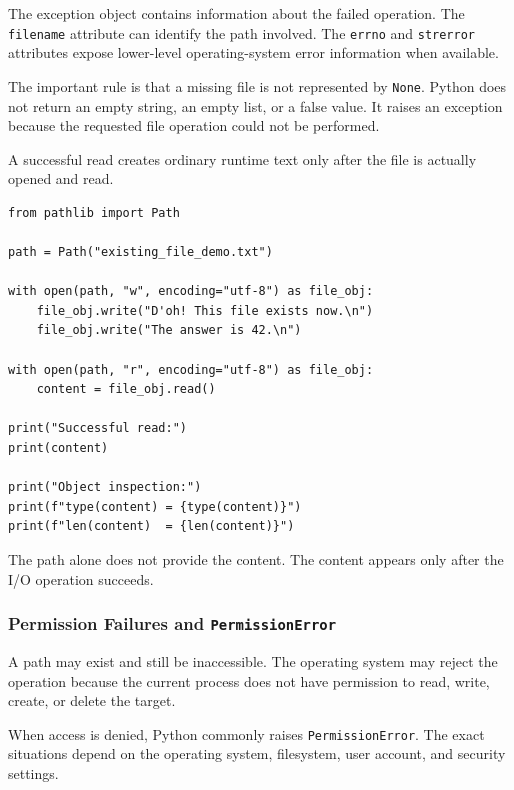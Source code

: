 The exception object contains information about the failed operation. The \texttt{filename} attribute can identify the path involved. The \texttt{errno} and \texttt{strerror} attributes expose lower-level operating-system error information when available.

The important rule is that a missing file is not represented by \texttt{None}. Python does not return an empty string, an empty list, or a false value. It raises an exception because the requested file operation could not be performed.

A successful read creates ordinary runtime text only after the file is actually opened and read.

\begin{verbatim}
from pathlib import Path

path = Path("existing_file_demo.txt")

with open(path, "w", encoding="utf-8") as file_obj:
    file_obj.write("D'oh! This file exists now.\n")
    file_obj.write("The answer is 42.\n")

with open(path, "r", encoding="utf-8") as file_obj:
    content = file_obj.read()

print("Successful read:")
print(content)

print("Object inspection:")
print(f"type(content) = {type(content)}")
print(f"len(content)  = {len(content)}")
\end{verbatim}

The path alone does not provide the content. The content appears only after the I/O operation succeeds.

\subsubsection{Permission Failures and \texttt{PermissionError}}

A path may exist and still be inaccessible. The operating system may reject the operation because the current process does not have permission to read, write, create, or delete the target.

When access is denied, Python commonly raises \texttt{PermissionError}. The exact situations depend on the operating system, filesystem, user account, and security settings.

